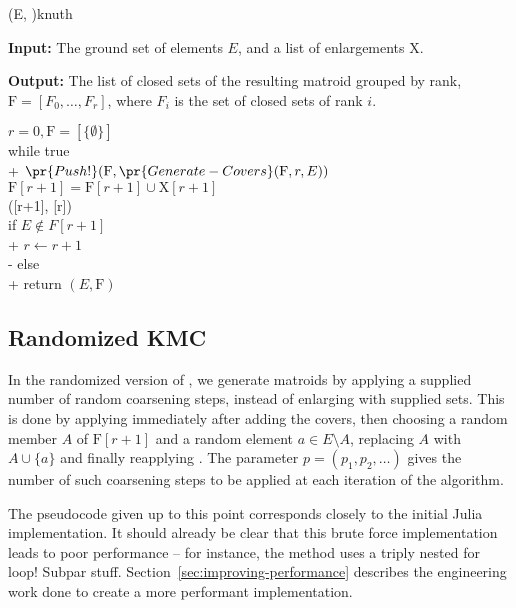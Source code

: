 \begin{algorithm}[float*=ht!]{(E, )}{knuth}

  \textbf{Input:}     \tab The ground set of elements $E$, and a list of enlargements $\mathrm{X}$.

  \textbf{Output:}    \tab The list of closed sets of the resulting matroid grouped by rank, \\
  \mbox{}\tab $\mathrm{F} = [F_0, \ldots, F_r]$, where $F_i$ is the set of closed sets of rank $i$.

  \begin{pseudo}[label=\small\arabic*, indent-mark, line-height=1.2]
    $r = 0, \mathrm{F} = [\{ \emptyset \}]$ \\
    while true  \\+
    $\pr{Push!}(\mathrm{F}, \pr{Generate-Covers}(\mathrm{F}, r, E))$ \\
    $\mathrm{F}[r+1] = \mathrm{F}[r+1] \cup \mathrm{X}[r+1]$ \\
    ([r+1], [r]) \\

    if $E \not \in F[r+1]$ \\+
    $r \leftarrow r+1$ \\-
    else \\+
    return $(E, \mathrm{F})$

  \end{pseudo}

\end{algorithm}


\subsection{Randomized KMC}
In the randomized version of , we generate matroids by applying a supplied number of random coarsening steps, instead of enlarging with supplied sets. This is done by applying  immediately after adding the covers, then choosing a random member $A$ of $\mathrm{F}[r+1]$ and a random element $a \in E \setminus A$, replacing $A$ with $A \cup \{a\}$ and finally reapplying . The parameter $p = (p_1, p_2, \ldots)$ gives the number of such coarsening steps to be applied at each iteration of the algorithm.

The pseudocode given up to this point corresponds closely to the initial Julia implementation. It should already be clear that this brute force implementation leads to poor performance -- for instance, the  method uses a triply nested for loop! Subpar stuff. Section~\ref{sec:improving-performance} describes the engineering work done to create a more performant implementation.

